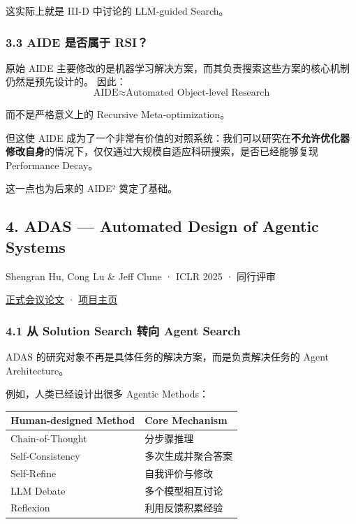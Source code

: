 这实际上就是 III-D 中讨论的 LLM-guided Search。

\hypertarget{part-3-44-0001-aide-ux662fux5426ux5c5eux4e8e-rsi}{%
\subsubsection{3.3 AIDE 是否属于 RSI？}\label{part-3-44-0001-aide-ux662fux5426ux5c5eux4e8e-rsi}}

原始 AIDE 主要修改的是机器学习解决方案，而其负责搜索这些方案的核心机制仍然是预先设计的。 因此：
\[\boxed{
\text{AIDE}
\approx
\text{Automated Object-level Research}
}\]

而不是严格意义上的 Recursive Meta-optimization。

但这使 AIDE 成为了一个非常有价值的对照系统：我们可以研究在\textbf{不允许优化器修改自身}的情况下，仅仅通过大规模自适应科研搜索，是否已经能够复现 Performance Decay。

这一点也为后来的 AIDE² 奠定了基础。

\hypertarget{part-3-44-0001-adas-automated-design-of-agentic-systems}{%
\subsection{4. ADAS --- Automated Design of Agentic Systems}\label{part-3-44-0001-adas-automated-design-of-agentic-systems}}

Shengran Hu, Cong Lu \& Jeff Clune · ICLR 2025 · 同行评审

\href{https://proceedings.iclr.cc/paper_files/paper/2025/hash/36b7acf6f6010652b3f2a433774a66fe-Abstract-Conference.html}{正式会议论文} · \href{https://www.shengranhu.com/ADAS/}{项目主页}

\hypertarget{part-3-44-0001-ux4ece-solution-search-ux8f6cux5411-agent-search}{%
\subsubsection{4.1 从 Solution Search 转向 Agent Search}\label{part-3-44-0001-ux4ece-solution-search-ux8f6cux5411-agent-search}}

ADAS 的研究对象不再是具体任务的解决方案，而是负责解决任务的 Agent Architecture。

例如，人类已经设计出很多 Agentic Methods：

\begin{readertable}
\begin{longtable}[]{@{}
  >{\raggedright\arraybackslash}p{}
  >{\raggedright\arraybackslash}p{}@{}}
\toprule
Human-designed Method & Core Mechanism \\
\midrule
\endhead
Chain-of-Thought & 分步骤推理 \\
Self-Consistency & 多次生成并聚合答案 \\
Self-Refine & 自我评价与修改 \\
LLM Debate & 多个模型相互讨论 \\
Reflexion & 利用反馈积累经验 \\
\bottomrule
\end{longtable}
\end{readertable}

